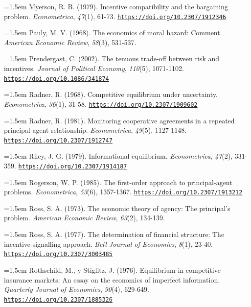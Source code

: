 \documentclass[10pt,a4paper]{article}
\begin{document}
\noindent\hangindent=1.5em Myerson, R. B. (1979). Incentive compatibility and the bargaining problem. \textit{Econometrica}, \textit{47}(1), 61-73. \href{https://doi.org/10.2307/1912346}{\nolinkurl{https://doi.org/10.2307/1912346}}

\noindent\hangindent=1.5em Pauly, M. V. (1968). The economics of moral hazard: Comment. \textit{American Economic Review}, \textit{58}(3), 531-537.

\noindent\hangindent=1.5em Prendergast, C. (2002). The tenuous trade-off between risk and incentives. \textit{Journal of Political Economy}, \textit{110}(5), 1071-1102. \href{https://doi.org/10.1086/341874}{\nolinkurl{https://doi.org/10.1086/341874}}

\noindent\hangindent=1.5em Radner, R. (1968). Competitive equilibrium under uncertainty. \textit{Econometrica}, \textit{36}(1), 31-58. \href{https://doi.org/10.2307/1909602}{\nolinkurl{https://doi.org/10.2307/1909602}}

\noindent\hangindent=1.5em Radner, R. (1981). Monitoring cooperative agreements in a repeated principal-agent relationship. \textit{Econometrica}, \textit{49}(5), 1127-1148. \href{https://doi.org/10.2307/1912747}{\nolinkurl{https://doi.org/10.2307/1912747}}

\noindent\hangindent=1.5em Riley, J. G. (1979). Informational equilibrium. \textit{Econometrica}, \textit{47}(2), 331-359. \href{https://doi.org/10.2307/1914187}{\nolinkurl{https://doi.org/10.2307/1914187}}

\noindent\hangindent=1.5em Rogerson, W. P. (1985). The first-order approach to principal-agent problems. \textit{Econometrica}, \textit{53}(6), 1357-1367. \href{https://doi.org/10.2307/1913212}{\nolinkurl{https://doi.org/10.2307/1913212}}

\noindent\hangindent=1.5em Ross, S. A. (1973). The economic theory of agency: The principal's problem. \textit{American Economic Review}, \textit{63}(2), 134-139.

\noindent\hangindent=1.5em Ross, S. A. (1977). The determination of financial structure: The incentive-signalling approach. \textit{Bell Journal of Economics}, \textit{8}(1), 23-40. \href{https://doi.org/10.2307/3003485}{\nolinkurl{https://doi.org/10.2307/3003485}}

\noindent\hangindent=1.5em Rothschild, M., y Stiglitz, J. (1976). Equilibrium in competitive insurance markets: An essay on the economics of imperfect information. \textit{Quarterly Journal of Economics}, \textit{90}(4), 629-649. \href{https://doi.org/10.2307/1885326}{\nolinkurl{https://doi.org/10.2307/1885326}}
\end{document}
